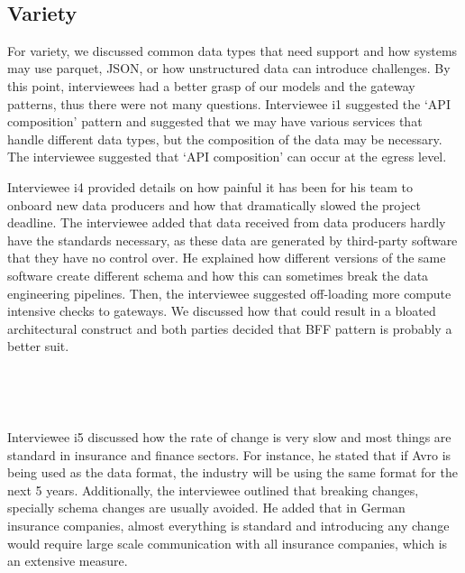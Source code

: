\documentclass{bmcart}
\begin{document}
\,

\setlength{\fboxsep}{0.7em}
\noindent{}


\subsection{Variety}

For variety, we discussed common data types that need support and how systems may use parquet, JSON, or how unstructured data can introduce challenges. By this point, interviewees had a better grasp of our models and the gateway patterns, thus there were not many questions. Interviewee i1 suggested the `API composition' pattern and suggested that we may have various services that handle different data types, but the composition of the data may be necessary. The interviewee suggested that `API composition' can occur at the egress level. 

Interviewee i4 provided details on how painful it has been for his team to onboard new data producers and how that dramatically slowed the project deadline. The interviewee added that data received from data producers hardly have the standards necessary, as these data are generated by third-party software that they have no control over. He explained how different versions of the same software create different schema and how this can sometimes break the data engineering pipelines. Then, the interviewee suggested off-loading more compute intensive checks to gateways. We discussed how that could result in a bloated architectural construct and both parties decided that BFF pattern is probably a better suit.  

\,

\setlength{\fboxsep}{0.7em}
\noindent{}

\,

Interviewee i5 discussed how the rate of change is very slow and most things are standard in insurance and finance sectors. For instance, he stated that if Avro is being used as the data format, the industry will be using the same format for the next 5 years. Additionally, the interviewee outlined that breaking changes, specially schema changes are usually avoided. He added that in German insurance companies, almost everything is standard and introducing any change would require large scale communication with all insurance companies, which is an extensive measure. 
\end{document}
